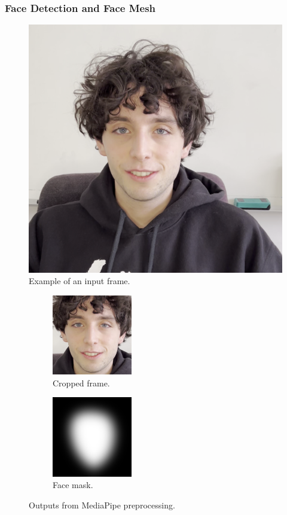\documentclass[preprint]{elsarticle}
\begin{document}
\subsubsection{Face Detection and Face Mesh}\label{sec:face_detection}

\begin{figure}[t]
	\centering
	\includegraphics[scale=0.18, keepaspectratio]{img/project_img/init.png}
	\caption{Example of an input frame.}\label{fig:init-frame}
\end{figure}



\begin{figure}[t]
	\centering
	\begin{subfigure}[b]{0.5\textwidth}
		\centering
		\includegraphics[width=3.5cm, keepaspectratio]{img/project_img/cropped.png}
		\caption{Cropped frame.}\label{fig:cropped}
	\end{subfigure}%
	\hfill
	\begin{subfigure}[b]{0.5\textwidth}
		\centering
		\includegraphics[width=3.5cm, keepaspectratio]{img/project_img/mask-blur.png}
		\caption{Face mask.}\label{fig:mask}
	\end{subfigure}
	\caption{Outputs from MediaPipe preprocessing.}\label{fig:project-mediapipe}
\end{figure}
\end{document}
